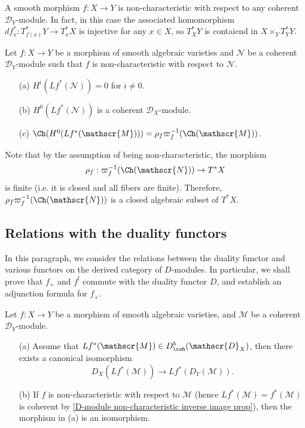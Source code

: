 \begin{example}
A smooth morphism $f:X\to Y$ is non-characteristic with respect to any coherent $\mathscr{D}_Y$-module. In fact, in this case the associated homomorphism $df_x^*:T_{f(x)}^*Y\to T^*_xX$ is injective for any $x\in X$, so $T_X^*Y$ is contaiend in $X\times_YT^*_YY$.
\end{example}

\begin{theorem}\label{D-module non-characteristic inverse image prop}
Let $f:X\to Y$ be a morphism of smooth algebraic varieties and $\mathscr{N}$ be a coherent $\mathscr{D}_Y$-module such that $f$ is non-characteristic with respect to $\mathscr{N}$.
\begin{enumerate}
    \item[(a)] $H^i(Lf^*(\mathscr{N}))=0$ for $i\neq 0$.
    \item[(b)] $H^0(Lf^*(\mathscr{N}))$ is a coherent $\mathscr{D}_X$-module.
    \item[(c)] $\Ch(H^0(Lf^*(\mathscr{M})))=\rho_f\varpi_f^{-1}(\Ch(\mathscr{M}))$. 
\end{enumerate}
\end{theorem}

\begin{remark}
Note that by the assumption of being non-characteristic, the morphism
\[\rho_f:\varpi_f^{-1}(\Ch(\mathscr{N}))\to T^*X\]
is finite (i.e. it is closed and all fibers are finite). Therefore, $\rho_f\varpi_f^{-1}(\Ch(\mathscr{N}))$ is a closed algebraic subset of $T^*X$.
\end{remark}

\subsection{Relations with the duality functors}
In this paragraph, we consider the relations between the duality functor and various functors on the derived category of $D$-modules. In particular, we shall prove that $f_+$ and $f^!$ commute with the duality functor $D$, and establish an adjunction formula for $f_+$.

\begin{theorem}\label{D-module duality functor and f^!}
Let $f:X\to Y$ be a morphism of smooth algebraic varieties, and $\mathscr{M}$ be a coherent $\mathscr{D}_Y$-module.
\begin{enumerate}
    \item[(a)] Assume that $Lf^*(\mathscr{M})\in D^b_{\coh}(\mathscr{D}_X)$, then there exists a canonical isomorphism
    \[D_X(Lf^*(\mathscr{M}))\to Lf^*(D_Y(\mathscr{M})).\]
    \item[(b)] If $f$ is non-characteristic with respect to $\mathscr{M}$ (hence $Lf^*(\mathscr{M})=f^*(\mathscr{M})$ is coherent by \cref{D-module non-characteristic inverse image prop}), then the morphism in (a) is an isomorphism.
\end{enumerate}
\end{theorem}


